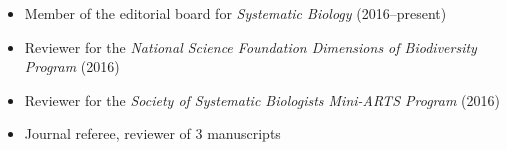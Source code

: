 \begin{itemize}
    \item Member of the editorial board for \emph{Systematic Biology}
            (2016--present)
    \item Reviewer for the \emph{National Science Foundation Dimensions of
            Biodiversity Program} (2016)
    \item Reviewer for the \emph{Society of Systematic Biologists Mini-ARTS
            Program} (2016)
    \item Journal referee, reviewer of 3 manuscripts
\end{itemize}
